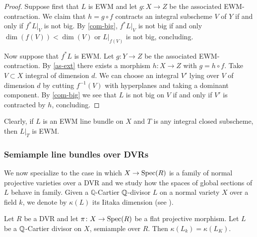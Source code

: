 \begin{proof}
	Suppose first that $L$ is EWM and let $g \colon X \to Z$ be the associated EWM-contraction. 	
	We claim that $h=g \circ f$ contracts an integral subscheme $V$ of $Y$ if and only if $f^{*}L|_{V}$ is not big. 	
	By \autoref{com-big}, $f^{*}L|_{V}$ is not big if and only $\dim (f(V))< \dim (V)$ or $L|_{f(V)}$ is not big, concluding. %
	
	Now suppose that $f^{*}L$ is EWM. Let $g \colon Y \to Z$ be the associated EWM-contraction. 
	By \autoref{as-ext} there exists a morphism $h \colon X \to Z$ with $g=h\circ f$. 
	Take $V\subset X$ integral of dimension $d$. We can choose an integral $V'$ lying over $V$ of dimension $d$ by cutting $f^{-1}(V)$ with hyperplanes and taking a dominant component. 
	By \autoref{com-big} we see that $L$ is not big on $V$ if and only if $V'$ is contracted by $h$, concluding.
\end{proof}

\begin{remark}
	Clearly, if $L$ is an EWM line bundle on $X$ and $T$ is any integral closed subscheme, then $L|_{T}$ is EWM.    
\end{remark}

	\subsubsection{Semiample line bundles over DVRs}
	We now specialize to the case in which $X\to\operatorname{Spec} (R)$ is a family of normal projective varieties over a DVR and we study how the spaces of global sections of $L$ behave in family. 	Given a $\mathbb{Q}$-Cartier $\mathbb{Q}$-divisor $L$ on a normal variety $X$ over a field $k$, we denote by $\kappa(L)$ its Iitaka dimension (see \cite[Definition 2.1.3]{Laz04}).
	
	\begin{lemma}\label{lemma_DIOK}
		Let $R$ be a DVR and let $\pi \colon X\to \operatorname{Spec} (R)$ be a flat projective morphism. 
		Let $L$ be a $\mathbb{Q}$-Cartier divisor on $X$, semiample over $R$. 
		Then $\kappa(L_k)=\kappa(L_K)$.
	\end{lemma}
	
